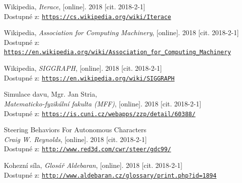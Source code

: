 \documentclass[czech,public,dept460,male,cpdeclaration]{diploma}
\begin{document}
\begin{thebibliography}{99}
	 Wikipedia,
		\textit{Iterace}, [online]. 2018 [cit. 2018-2-1]\\
		Dostupné z: \href{https://cs.wikipedia.org/wiki/Iterace}{\texttt{https://cs.wikipedia.org/wiki/Iterace}}
		
	 Wikipedia,
		\textit{Association for Computing Machinery}, [online]. 2018 [cit. 2018-2-1]\\
		Dostupné z: \href{https://en.wikipedia.org/wiki/Association\_for\_Computing\_Machinery}{\texttt{https://en.wikipedia.org/wiki/Association\_for\_Computing\_Machinery}}
		
	 Wikipedia,
		\textit{SIGGRAPH}, [online]. 2018 [cit. 2018-2-1]\\
		Dostupné z: \href{https://en.wikipedia.org/wiki/SIGGRAPH}{\texttt{https://en.wikipedia.org/wiki/SIGGRAPH}}
		
	 Simulace davu, Mgr. Jan Stria,\\
		\textit{Matematicko-fyzikální fakulta (MFF)}, [online]. 2018 [cit. 2018-2-1]\\
		Dostupné z: \href{https://is.cuni.cz/webapps/zzp/detail/60388/}{\texttt{https://is.cuni.cz/webapps/zzp/detail/60388/}}
		
	 Steering Behaviors For Autonomous Characters\\
		\textit{Craig W. Reynolds}, [online]. 2018 [cit. 2018-2-1]\\
		Dostupné z: \href{http://www.red3d.com/cwr/steer/gdc99/}{\texttt{http://www.red3d.com/cwr/steer/gdc99/}}
		
	 Kohezní síla,
		\textit{Glosář Aldebaran}, [online]. 2018 [cit. 2018-2-1]\\
		Dostupné z: \href{http://www.aldebaran.cz/glossary/print.php?id=1894}{\texttt{http://www.aldebaran.cz/glossary/print.php?id=1894}}
		
\end{thebibliography}



\end{document}
